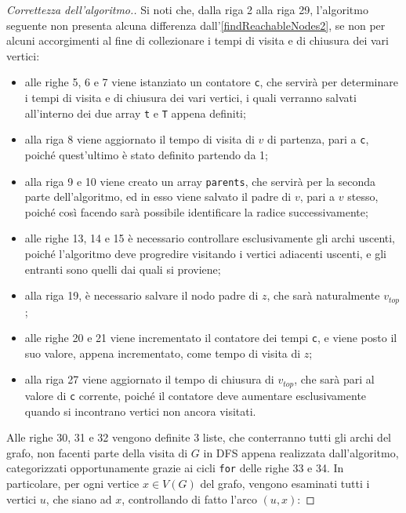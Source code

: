 \documentclass[a4paper, 12pt]{report}
\begin{document}
    \begin{proof}[Correttezza dell'algoritmo.]
        Si noti che, dalla riga 2 alla riga 29, l'algoritmo seguente non presenta alcuna differenza dall'\cref{findReachableNodes2}, se non per alcuni accorgimenti al fine di collezionare i tempi di visita e di chiusura dei vari vertici:

        \begin{itemize}
            \item alle righe 5, 6 e 7 viene istanziato un contatore \texttt{c}, che servirà per determinare i tempi di visita e di chiusura dei vari vertici, i quali verranno salvati all'interno dei due array \texttt{t} e \texttt{T} appena definiti;
            \item alla riga 8 viene aggiornato il tempo di visita di $v$ di partenza, pari a \texttt{c}, poiché quest'ultimo è stato definito partendo da 1;
            \item alla riga 9 e 10 viene creato un array \texttt{parents}, che servirà per la seconda parte dell'algoritmo, ed in esso viene salvato il padre di $v$, pari a $v$ stesso, poiché così facendo sarà possibile identificare la radice successivamente;
            \item alle righe 13, 14 e 15 è necessario controllare esclusivamente gli archi uscenti, poiché l'algoritmo deve progredire visitando i vertici adiacenti uscenti, e gli entranti sono quelli dai quali si proviene;
            \item alla riga 19, è necessario salvare il nodo padre di $z$, che sarà naturalmente $v_{top}$;
            \item alle righe 20 e 21 viene incrementato il contatore dei tempi \texttt{c}, e viene posto il suo valore, appena incrementato, come tempo di visita di $z$;
            \item alla riga 27 viene aggiornato il tempo di chiusura di $v_{top}$, che sarà pari al valore di \texttt{c} corrente, poiché il contatore deve aumentare esclusivamente quando si incontrano vertici non ancora visitati.
        \end{itemize}

        Alle righe 30, 31 e 32 vengono definite 3 liste, che conterranno tutti gli archi del grafo, non facenti parte della visita di $G$ in DFS appena realizzata dall'algoritmo, categorizzati opportunamente grazie ai cicli \texttt{for} delle righe 33 e 34. In particolare, per ogni vertice $x \in V(G)$ del grafo, vengono esaminati tutti i vertici $u$, che siano  ad $x$, controllando di fatto l'arco $(u, x)$:


\end{proof}
\end{document}
